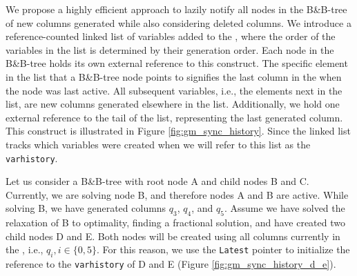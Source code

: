 We propose a highly efficient approach to lazily notify all nodes in the B\&B-tree of new columns generated while also considering deleted columns. We introduce a reference-counted linked list of variables added to the \RMP{}, where the order of the variables in the list is determined by their generation order. Each node in the B\&B-tree holds its own external reference to this construct. The specific element in the list that a B\&B-tree node points to signifies the last column in the \RMP{} when the node was last active. All subsequent variables, i.e., the elements next in the list, are new columns generated elsewhere in the list. Additionally, we hold one external reference to the tail of the list, representing the last generated column. This construct is illustrated in Figure \ref{fig:gm_sync_history}. Since the linked list tracks which variables were created when we will refer to this list as the \texttt{varhistory}.

Let us consider a B\&B-tree with root node A and child nodes B and C. Currently, we are solving node B, and therefore nodes A and B are active. While solving B, we have generated columns $q_3$, $q_4$, and $q_5$. Assume we have solved the relaxation of B to optimality, finding a fractional solution, and have created two child nodes D and E. Both nodes will be created using all columns currently in the \RMP{}, i.e., $q_i, i \in \{0, 5\}$. For this reason, we use the \texttt{Latest} pointer to initialize the reference to the \texttt{varhistory} of D and E (Figure \ref{fig:gm_sync_history_d_e}).

